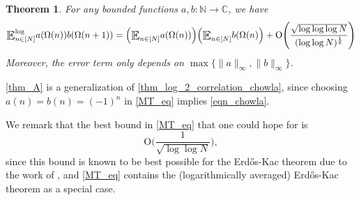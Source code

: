 \documentclass[letter,11pt]{article}
\theoremstyle{plain} %
\theoremstyle{definition} %
\theoremstyle{plain}
\newcounter{MainTheoremCounter}
\newtheorem{maintheorem}[MainTheoremCounter]{Theorem}
\theoremstyle{plain}
\theoremstyle{plain}
\numberwithin{equation}{section}
\newcommand{\Erdos}{Erd\H{o}s}
\newcommand{\Radziwill}{Radziwi\l\l{}}
\newcommand{\Oh}{{\mathrm O}}
\newcommand{\N}{\mathbb{N}}
\newcommand{\C}{\mathbb{C}}
\newcommand{\edit}[3]{\color{#1}{#3}\color{black}\marginpar{\textcolor{#1}{[[#2]]}}}
\newcommand{\dc}[1]{\edit{blue}{DC}{#1}}
\newcommand{\E}{\raisebox{-0.4ex}{\scalebox{1.4}[1.3]{$\mathbb{E}$}}}
\newcommand{\Esub}[1]{\raisebox{-0.4ex}{\scalebox{1.4}[1.3]{$\mathbb{E}$}}\raisebox{-0.35ex}{\ensuremath{_{\scriptstyle #1}}}}
\newcommand{\logE}{{\E}^{\log}}
\newcommand{\1}{\mathbbm{1}}
\begin{document}
\begin{maintheorem}\label{MT}\label{thm_A}
For any bounded functions $a,b\colon\N\to\C$, we have
    \begin{equation}\label{MT_eq}
        \logE_{n\in[N]} a(\Omega(n))b(\Omega(n+1)) 
        = \Big(\Esub{n\in[N]}a(\Omega(n))\Big)\Big(\Esub{n\in[N]}b(\Omega(n)\Big)
        + \Oh\Bigg(\frac{\sqrt{\log\log\log{N}}}{(\log\log{N})^\frac{1}{6}}\Bigg)
    \end{equation}
    Moreover, the error term only depends on $\max\{\|a\|_\infty,\|b\|_\infty\}$.
\end{maintheorem}

\cref{thm_A} is a generalization of \cref{thm_log_2_correlation_chowla}, since choosing $a(n)=b(n)=(-1)^n$ in \eqref{MT_eq} implies \eqref{eqn_chowla}.

We remark that the best bound in \eqref{MT_eq} that one could hope for is 
\[
\Oh\bigg(\frac{1}{\sqrt{\log\log{N}}}\bigg),
\]
since this bound is known to be best possible for the \Erdos{}-Kac theorem due to the work of \cite{renyi-turan}, and \eqref{MT_eq} contains the (logarithmically averaged) \Erdos{}-Kac theorem as a special case.
\end{document}
